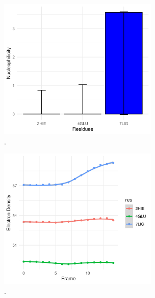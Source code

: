 \documentclass[a4paper,11pt]{refart}
\begin{document}
\hspace*{-\leftmarginwidth}
\begin{minipage}{\fullwidth}
	\begin{figure}[H]
		\begin{center}
			\includegraphics[width=3in]{images/tut6_img13}
			\caption{.}
			\label{fig_tut6_12}
		\end{center}
	\end{figure}
\end{minipage}

\hspace*{-\leftmarginwidth}
\begin{minipage}{\fullwidth}
	\begin{figure}[H]
		\begin{center}
			\includegraphics[width=3in]{images/tut6_img14}
			\caption{.}
			\label{fig_tut6_13}
		\end{center}
	\end{figure}
\end{minipage}
\end{document}
